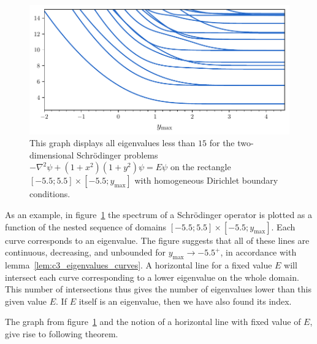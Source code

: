 \begin{figure}
  \begin{center}
    \includegraphics[width=\textwidth]{img/chapter3/counting/counting_eigenvalues.pdf}
    \caption{This graph displays all eigenvalues less than $15$ for the two-dimensional Schrödinger problems $-\nabla^2 \psi + (1+x^2)(1+y^2)\psi = E \psi$ on the rectangle $[-5.5; 5.5]\times[-5.5; y_{\text{max}}]$ with homogeneous Dirichlet boundary conditions.}\label{fig:c3_counting_eigenvalue_graph}
  \end{center}
\end{figure}

As an example, in figure~\ref{fig:c3_counting_eigenvalue_graph} the spectrum of a Schrödinger operator is plotted as a function of the nested sequence of domains $[-5.5; 5.5] \times [-5.5; y_{\text{max}}]$. Each curve corresponds to an eigenvalue. The figure suggests that all of these lines are continuous, decreasing, and unbounded for $y_{\text{max}} \to -5.5^{+}$, in accordance with lemma~\ref{lem:c3_eigenvalues_curves}. A horizontal line for a fixed value $E$ will intersect each curve corresponding to a lower eigenvalue on the whole domain. This number of
intersections thus gives the number of eigenvalues lower than this given value $E$. If $E$ itself is an eigenvalue, then we have also found its index.

The graph from figure~\ref{fig:c3_counting_eigenvalue_graph} and the notion of a horizontal line with fixed value of $E$, give rise to following theorem.

